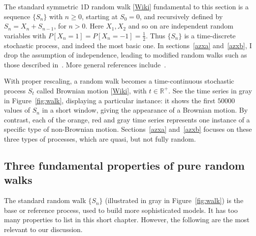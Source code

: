 \documentclass[oneside,10pt]{book}
\begin{document}
The standard symmetric 1D \textcolor{index}{random walk} [\href{https://en.wikipedia.org/wiki/Random_walk}{Wiki}] fundamental to this section is a sequence $\{S_n\}$ with $n\geq 0$, starting at $S_0=0$, and recursively defined by 
$S_{n}=X_{n}+S_{n-1}$, for $n>0$.  Here $X_1,X_2$ and so on are independent random variables with $P[X_n=1]=P[X_n=-1]=\frac{1}{2}$. 
 Thus $\{S_n\}$ is a time-discrete stochastic process, and indeed the most basic one. In sections~\ref{azxa} and~\ref{azxb}, I drop the assumption
 of independence, leading to modified random walks such as those described in~\cite{nkrn2018,lanwu2012}.
More general references include~\cite{gtm2021,peresbrown}.

With proper rescaling, a random walk becomes a time-continuous stochastic process $S_t$ called \textcolor{index}{Brownian motion} [\href{https://en.wikipedia.org/wiki/Brownian_motion}{Wiki}], with $t\in\mathbb{R}^+$. See the time series in gray in Figure~\ref{fig:walk}, displaying a particular instance: it shows the first $\num{50000}$ values of
 $S_n$ in a short window, giving the appearance of a Brownian motion. 
By contrast, each of the orange, red and gray time series represents one instance of a specific type of non-Brownian motion. Sections~\ref{azxa} and~\ref{azxb} focuses on these three types of processes,  which are quasi, but not fully random.


\subsection{Three fundamental properties of pure random walks}\label{poyt}

The standard random walk $\{S_n\}$ (illustrated in gray in Figure~\ref{fig:walk}) is the base or reference process, used to build more sophisticated models. It has too many properties to list in this short chapter. However, the following are the most relevant to our discussion.
\end{document}
